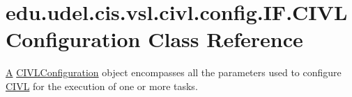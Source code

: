 \hypertarget{classedu_1_1udel_1_1cis_1_1vsl_1_1civl_1_1config_1_1IF_1_1CIVLConfiguration}{}\section{edu.\+udel.\+cis.\+vsl.\+civl.\+config.\+I\+F.\+C\+I\+V\+L\+Configuration Class Reference}
\label{classedu_1_1udel_1_1cis_1_1vsl_1_1civl_1_1config_1_1IF_1_1CIVLConfiguration}


\hyperlink{structA}{A} \hyperlink{classedu_1_1udel_1_1cis_1_1vsl_1_1civl_1_1config_1_1IF_1_1CIVLConfiguration}{C\+I\+V\+L\+Configuration} object encompasses all the parameters used to configure \hyperlink{classedu_1_1udel_1_1cis_1_1vsl_1_1civl_1_1CIVL}{C\+I\+V\+L} for the execution of one or more tasks.  


